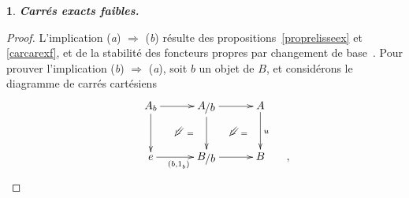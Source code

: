\documentclass[francais]{smfart}
\theoremstyle{plain}
\theoremstyle{remark}
\theoremstyle{definition}
\newtheorem{paragr}[thm]{}
\numberwithin{equation}{thm}
\begin{document}
\begin{paragr} {\emph{\textbf{{Carrés exacts faibles}.\ }}}
\begin{proof} L'implication (\emph{a}) $\Rightarrow$ (\emph{b}) résulte des propositions~\ref{proprelisseex} et \ref{carcarexf}, et de la stabilité des foncteurs propres par changement de base~\cite[corollaire 3.2.4]{Ast}. Pour prouver l'implication (\emph{b}) $\Rightarrow$ (\emph{a}), soit $b$ un objet de $B$, et considérons le diagramme de carrés cartésiens 
\[
\UseTwocells
\xymatrixcolsep{2.5pc}
\xymatrixrowsep{2.4pc}
\xymatrix{
&A_b\ar[d]_{}\ar[r]^{}
\drtwocell<\omit>{}
&{\mathchoice {{A}\raise -1.8pt\vbox{\hbox{$\kern -.8pt/{b}$}}} {{A}\raise -1.8pt\vbox{\hbox{$\kern -.8pt/{b}$}}\kern .8pt} {{A}\raise -1.8pt\vbox{\hbox{$\scriptstyle\kern -.8pt /{b}$}}} {{A}\raise -1.8pt\vbox{\hbox{$\scriptscriptstyle\kern -.8pt /{b}$}}} }\ar[d]^{}\ar[r]^{}\ar@<-2ex>@{}[d]_(.55){=}
\drtwocell<\omit>{}
&A\ar[d]^{u}\ar@<-2ex>@{}[d]_(.55){=}
\\
&e\ar[r]_{(b,{1^{}_{{b}}})}
&{\mathchoice {{B}\raise -1.8pt\vbox{\hbox{$\kern -.8pt/{b}$}}} {{B}\raise -1.8pt\vbox{\hbox{$\kern -.8pt/{b}$}}\kern .8pt} {{B}\raise -1.8pt\vbox{\hbox{$\scriptstyle\kern -.8pt /{b}$}}} {{B}\raise -1.8pt\vbox{\hbox{$\scriptscriptstyle\kern -.8pt /{b}$}}} }\ar[r]_{}
&B
&\hskip -30pt,
}
\]

\end{proof}
\end{paragr}
\end{document}
